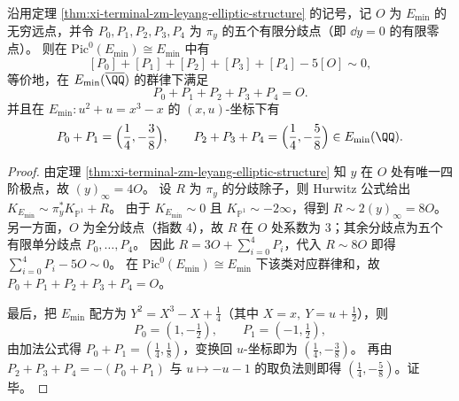 \begin{corollary}[分歧除子的主化与有限分歧点的群律守恒]\label{cor:xi-terminal-zm-leyang-ramification-sum-zero}
沿用定理 \ref{thm:xi-terminal-zm-leyang-elliptic-structure} 的记号，记 \(O\) 为 \(E_{\min}\) 的无穷远点，并令 \(P_0,P_1,P_2,P_3,P_4\) 为 \(\pi_y\) 的五个有限分歧点（即 \(\dd y=0\) 的有限零点）。
则在 \(\mathrm{Pic}^0(E_{\min})\cong E_{\min}\) 中有
\[
[P_0]+[P_1]+[P_2]+[P_3]+[P_4]-5[O]\sim 0,
\]
等价地，在 \(E_{\min}(\overline{\QQ})\) 的群律下满足
\[
P_0+P_1+P_2+P_3+P_4=O.
\]
并且在 \(E_{\min}:u^2+u=x^3-x\) 的 \((x,u)\)-坐标下有
\[
P_0+P_1=\Bigl(\frac14,-\frac38\Bigr),\qquad
P_2+P_3+P_4=\Bigl(\frac14,-\frac58\Bigr)\in E_{\min}(\QQ).
\]
\end{corollary}
\begin{proof}
由定理 \ref{thm:xi-terminal-zm-leyang-elliptic-structure} 知 \(y\) 在 \(O\) 处有唯一四阶极点，故 \((y)_\infty=4O\)。
设 \(R\) 为 \(\pi_y\) 的分歧除子，则 Hurwitz 公式给出
\(
K_{E_{\min}}\sim \pi_y^*K_{\mathbb P^1}+R
\)。
由于 \(K_{E_{\min}}\sim 0\) 且 \(K_{\mathbb P^1}\sim-2\infty\)，得到
\(
R\sim 2(y)_\infty=8O
\)。
另一方面，\(O\) 为全分歧点（指数 \(4\)），故 \(R\) 在 \(O\) 处系数为 \(3\)；其余分歧点为五个有限单分歧点 \(P_0,\dots,P_4\)。
因此 \(R=3O+\sum_{i=0}^{4}P_i\)，代入 \(R\sim 8O\) 即得 \(\sum_{i=0}^{4}P_i-5O\sim 0\)。
在 \(\mathrm{Pic}^0(E_{\min})\cong E_{\min}\) 下该类对应群律和，故 \(P_0+P_1+P_2+P_3+P_4=O\)。
\par
最后，把 \(E_{\min}\) 配方为 \(Y^2=X^3-X+\tfrac14\)（其中 \(X=x,\ Y=u+\tfrac12\)），则
\[
P_0=(1,-\tfrac12),\qquad P_1=(-1,\tfrac12),
\]
由加法公式得 \(P_0+P_1=(\tfrac14,\tfrac18)\)，变换回 \(u\)-坐标即为 \((\tfrac14,-\tfrac38)\)。
再由 \(P_2+P_3+P_4=-(P_0+P_1)\) 与 \(u\mapsto -u-1\) 的取负法则即得 \((\tfrac14,-\tfrac58)\)。证毕。
\end{proof}

